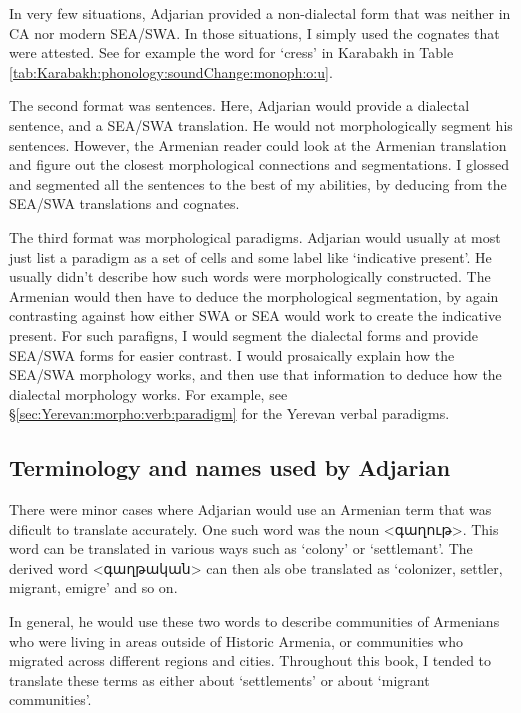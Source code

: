 In very few situations, Adjarian provided a non-dialectal form that was neither in CA nor modern SEA/SWA. In those situations, I simply used the cognates that were attested. See for example the word for `cress' in Karabakh in Table \ref{tab:Karabakh:phonology:soundChange:monoph:o:u}. 


The second format was   sentences. Here, Adjarian would provide a dialectal sentence, and a SEA/SWA translation. He would not morphologically segment his sentences. However, the Armenian reader could look at the Armenian translation and figure out the closest morphological connections and segmentations. I glossed and segmented all the sentences to the best of my abilities, by deducing from the SEA/SWA translations and cognates. 

The third format was morphological paradigms. Adjarian would usually at most just list a paradigm as a set of cells and some label like `indicative present'. He usually didn't describe how such words were morphologically constructed. The Armenian would then have to deduce the morphological segmentation, by again contrasting against how either SWA or SEA would work to  create the indicative present. For such parafigns, I would segment the dialectal forms and provide SEA/SWA forms for easier contrast. I would prosaically explain how the SEA/SWA morphology works, and then use that information to deduce how the dialectal morphology works. For example, see \S\ref{sec:Yerevan:morpho:verb:paradigm} for the Yerevan verbal paradigms. 



\subsection{Terminology and names used by Adjarian}\label{sec:HossepIntro:translation:name}

There were minor cases where Adjarian would use an Armenian term that was dificult to translate accurately. One such word was the noun <գաղութ>. This word can be translated in various ways such as `colony' or `settlemant'. The derived word <գաղթական> can then als obe translated as `colonizer, settler, migrant, emigre' and so on. 

In general, he would use these two words to describe communities of Armenians who were living in areas outside of Historic Armenia, or communities who migrated across different regions and cities. Throughout this book, I tended to translate these terms as either about `settlements' or about `migrant communities'.


